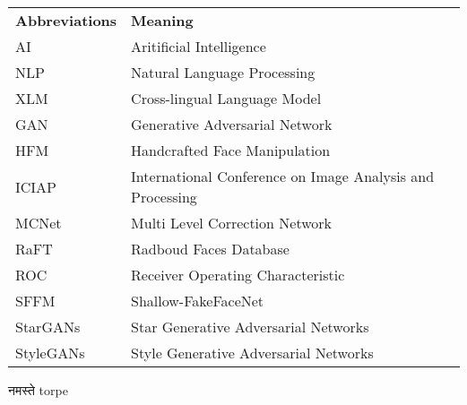\begin{table}[h]
	\begin{tabular}{l l}
		\textbf{Abbreviations} & \textbf{Meaning}                                   \\
		AI                     & Aritificial Intelligence\\
		NLP                    & Natural Language Processing\\
		XLM                    & Cross-lingual Language Model\\
		GAN                    & Generative Adversarial Network                     \\
		HFM                    & Handcrafted Face Manipulation                       \\
		ICIAP                  & International Conference on Image Analysis and Processing \\
		MCNet                  & Multi Level Correction Network                     \\
		RaFT                   & Radboud Faces Database                             \\
		ROC                    & Receiver Operating Characteristic                   \\
		SFFM                   & Shallow-FakeFaceNet                                 \\
		StarGANs               & Star Generative Adversarial Networks               \\
		StyleGANs              & Style Generative Adversarial Networks               \\
	\end{tabular}
\end{table}
\pagebreak

 \textsanskrit{नमस्ते}
 \textenglish{torpe}